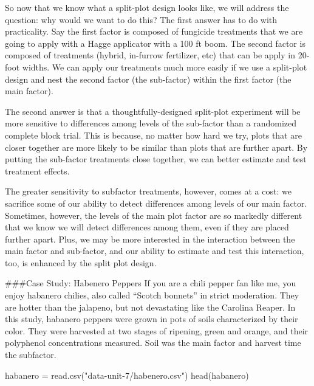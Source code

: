 \documentclass[
]{book}
\newenvironment{Shaded}{\begin{snugshade}}{\end{snugshade}}
\newcommand{\FunctionTok}[1]{\textcolor[rgb]{0.00,0.00,0.00}{#1}}
\newcommand{\NormalTok}[1]{#1}
\newcommand{\OtherTok}[1]{\textcolor[rgb]{0.56,0.35,0.01}{#1}}
\newcommand{\StringTok}[1]{\textcolor[rgb]{0.31,0.60,0.02}{#1}}
\begin{document}
So now that we know what a split-plot design looks like, we will address the question: why would we want to do this? The first answer has to do with practicality. Say the first factor is composed of fungicide treatments that we are going to apply with a Hagge applicator with a 100 ft boom. The second factor is composed of treatments (hybrid, in-furrow fertilizer, etc) that can be apply in 20-foot widths. We can apply our treatments much more easily if we use a split-plot design and nest the second factor (the sub-factor) within the first factor (the main factor).

The second answer is that a thoughtfully-designed split-plot experiment will be more sensitive to differences among levels of the sub-factor than a randomized complete block trial. This is because, no matter how hard we try, plots that are closer together are more likely to be similar than plots that are further apart. By putting the sub-factor treatments close together, we can better estimate and test treatment effects.

The greater sensitivity to subfactor treatments, however, comes at a cost: we sacrifice some of our ability to detect differences among levels of our main factor. Sometimes, however, the levels of the main plot factor are so markedly different that we know we will detect differences among them, even if they are placed further apart. Plus, we may be more interested in the interaction between the main factor and sub-factor, and our ability to estimate and test this interaction, too, is enhanced by the split plot design.

\#\#\#Case Study: Habenero Peppers
If you are a chili pepper fan like me, you enjoy habanero chilies, also called ``Scotch bonnets'' in strict moderation. They are hotter than the jalapeno, but not devastating like the Carolina Reaper. In this study, habanero peppers were grown in pots of soils characterized by their color. They were harvested at two stages of ripening, green and orange, and their polyphenol concentrations measured. Soil was the main factor and harvest time the subfactor.

\begin{Shaded}
\begin{Highlighting}[]
\NormalTok{habanero }\OtherTok{=} \FunctionTok{read.csv}\NormalTok{(}\StringTok{"data{-}unit{-}7/habenero.csv"}\NormalTok{)}
\FunctionTok{head}\NormalTok{(habanero)}
\end{Highlighting}
\end{Shaded}
\end{document}
